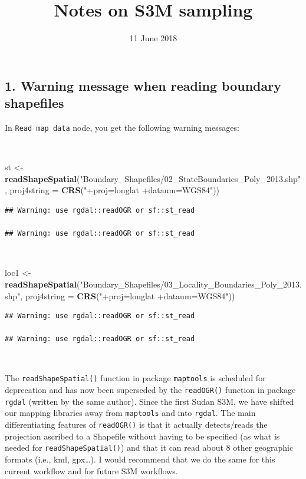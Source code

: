 \documentclass[11pt,a4paper]{article}
\title{Notes on S3M sampling}
\author{}
\date{11 June 2018}
\newenvironment{Shaded}{}{}
\newcommand{\KeywordTok}[1]{\textcolor[rgb]{0.00,0.44,0.13}{\textbf{#1}}}
\newcommand{\DataTypeTok}[1]{\textcolor[rgb]{0.56,0.13,0.00}{#1}}
\newcommand{\StringTok}[1]{\textcolor[rgb]{0.25,0.44,0.63}{#1}}
\newcommand{\NormalTok}[1]{#1}
\begin{document}
\maketitle

\hypertarget{warning-message-when-reading-boundary-shapefiles}{%
\subsection{1. Warning message when reading boundary
shapefiles}\label{warning-message-when-reading-boundary-shapefiles}}

In \texttt{Read\ map\ data} node, you get the following warning
messages:

~

\begin{Shaded}
\begin{Highlighting}[]
\NormalTok{st <-}\StringTok{ }\KeywordTok{readShapeSpatial}\NormalTok{(}\StringTok{"Boundary_Shapefiles/02_StateBoundaries_Poly_2013.shp"}\NormalTok{, }
                       \DataTypeTok{proj4string =} \KeywordTok{CRS}\NormalTok{(}\StringTok{"+proj=longlat +dataum=WGS84"}\NormalTok{))}
\end{Highlighting}
\end{Shaded}

\begin{verbatim}
## Warning: use rgdal::readOGR or sf::st_read

## Warning: use rgdal::readOGR or sf::st_read
\end{verbatim}

~

\begin{Shaded}
\begin{Highlighting}[]
\NormalTok{loc1 <-}\StringTok{ }\KeywordTok{readShapeSpatial}\NormalTok{(}\StringTok{"Boundary_Shapefiles/03_Locality_Boundaries_Poly_2013.shp"}\NormalTok{, }
                         \DataTypeTok{proj4string =} \KeywordTok{CRS}\NormalTok{(}\StringTok{"+proj=longlat +dataum=WGS84"}\NormalTok{))}
\end{Highlighting}
\end{Shaded}

\begin{verbatim}
## Warning: use rgdal::readOGR or sf::st_read

## Warning: use rgdal::readOGR or sf::st_read
\end{verbatim}

~

The \texttt{readShapeSpatial()} function in package \texttt{maptools} is
scheduled for deprecation and has now been superseded by the
\texttt{readOGR()} function in package \texttt{rgdal} (written by the
same author). Since the first Sudan S3M, we have shifted our mapping
libraries away from \texttt{maptools} and into \texttt{rgdal}. The main
differentiating features of \texttt{readOGR()} is that it actually
detects/reads the projection ascribed to a Shapefile without having to
be specified (as what is needed for \texttt{readShapeSpatial()}) and
that it can read about 8 other geographic formats (i.e., kml,
gpx\ldots{}). I would recommend that we do the same for this current
workflow and for future S3M workflows.
\end{document}
